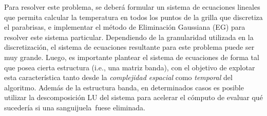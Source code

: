 \documentclass[11pt, a4paper]{article}
\newcommand{\atacante}{sanguijuela}
\newcommand{\objeto}{parabrisas}
\begin{document}
Para resolver este problema, se deber\'a formular un sistema de ecuaciones lineales que permita calcular la temperatura en todos los puntos de la grilla que discretiza el \objeto, e implementar el m\'etodo de Eliminaci\'on Gaussiana (EG) para resolver este sistema particular. Dependiendo de la granularidad utilizada en la discretizaci\'on, el sistema de ecuaciones resultante para este problema puede ser muy grande. Luego, es importante plantear el sistema de ecuaciones de forma tal que posea cierta estructura (i.e., una matriz banda), con el objetivo de explotar esta caracter\'istica tanto desde la \emph{complejidad espacial} como \emph{temporal} del algoritmo. Adem\'as de la estructura banda, en determinados casos es posible utilizar la descomposici\'on LU del sistema para acelerar el cómputo de evaluar qu\'e suceder\'ia si una \atacante\ fuese eliminada.
\end{document}
